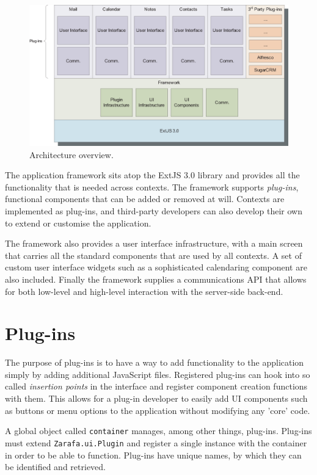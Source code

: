 \begin{figure}[h!]
\centering
\includegraphics[width=14cm]{figures/stack.eps}
\caption{Architecture overview.}
\label{figure:architecture}
\end{figure}

The application framework sits atop the ExtJS 3.0 library and provides all the functionality that is needed across
contexts. The framework supports \emph{plug-ins}, functional components that can be added or removed at will. 
Contexts are implemented as plug-ins, and third-party developers can also develop their own to extend or 
customise the application.

The framework also provides a user interface infrastructure, with a main screen that carries all the standard
components that are used by all contexts. A set of custom user interface widgets such as a sophisticated
calendaring component are also included. Finally the framework supplies a communications API that allows
for both low-level and high-level interaction with the server-side back-end.

\section{Plug-ins}

The purpose of plug-ins is to have a way to add functionality to the application simply by adding additional
JavaScript files. 
Registered plug-ins can hook into so called \emph{insertion points} in the interface and register component
creation functions with them. This allows for a plug-in developer to easily add UI components such as buttons
or menu options to the application without modifying any 'core' code. 

A global object called {\tt container} manages, among other things, plug-ins. Plug-ins must extend {\tt Zarafa.ui.Plugin} 
and register a single instance with the container in order to be able to function. Plug-ins have unique names, by which
they can be identified and retrieved. 

